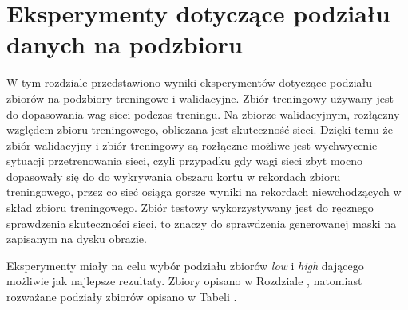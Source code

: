 \section{Eksperymenty dotyczące podziału danych na podzbioru}
\label{sec:podzial_eksperyment}

W tym rozdziale przedstawiono wyniki eksperymentów dotyczące podziału zbiorów na podzbiory treningowe i walidacyjne.
Zbiór treningowy używany jest do dopasowania wag sieci podczas treningu.
Na zbiorze walidacyjnym, rozłączny względem zbioru treningowego, obliczana jest skuteczność sieci.
Dzięki temu że zbiór walidacyjny i zbiór treningowy są rozłączne możliwe jest wychwycenie sytuacji przetrenowania sieci, czyli przypadku gdy wagi sieci zbyt mocno dopasowały się do do wykrywania obszaru kortu w rekordach zbioru treningowego, przez co sieć osiąga gorsze wyniki na rekordach niewchodzących w skład zbioru treningowego.
Zbiór testowy wykorzystywany jest do ręcznego sprawdzenia skuteczności sieci, to znaczy do sprawdzenia generowanej maski na zapisanym na dysku obrazie.

Eksperymenty miały na celu wybór podziału zbiorów \textit{low} i \textit{high} dającego możliwie jak najlepsze rezultaty. Zbiory opisano w Rozdziale , natomiast rozważane podziały zbiorów opisano w Tabeli .
